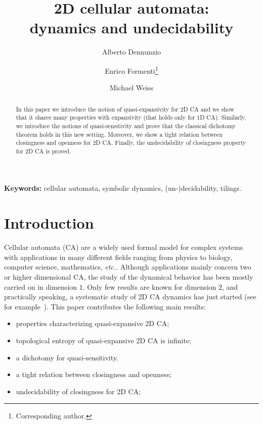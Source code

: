\documentclass{llncs}
\makeatletter
\newcommand{\etc}{\emph{etc.}\@\xspace}
\newcommand{\ignore}[1]{}
\makeatother
\begin{document}
\pagestyle{empty}  \mainmatter
\title{2D cellular automata:\\ dynamics and undecidability
\ignore{
\thanks{This work has been supported by
the PRIN/MIUR project
``Formal Languages and Automata: Mathematical and Applicative Aspects''.} }}\author{Alberto Dennunzio
\and Enrico Formenti\thanks{Corresponding author.}
\and Michael Weiss}
\maketitle

\begin{abstract}
In this paper we introduce the notion of quasi-expansivity for 2D
CA and we show that it shares many properties with expansivity (that holds only for 1D
CA). Similarly, we introduce the notions of quasi-sensitivity and prove that the classical dichotomy theorem holds in
this new setting. Moreover, we show a tight relation between 
closingness and openness for 2D CA. Finally, the undecidability of
closingness property for 2D CA is proved. 
\end{abstract}
\noindent
\textbf{Keywords:} cellular automata, symbolic dynamics, (un-)decidability, tilings.



\section{Introduction}
Cellular automata (CA) are a widely used formal model for complex systems with applications in many different fields ranging from
physics to biology, computer science, mathematics, \etc.
Although applications mainly concern two or higher dimensional
CA, the study of the dynamical behavior has been mostly carried on 
in dimension $1$. Only few results are known for dimension $2$, and practically speaking,  a systematic study of 2D CA dynamics has just started (see for example~\cite{theyssier08,dennunzio08}).
This paper contributes the following main results:
\begin{itemize}
\item properties characterizing quasi-expansive 2D CA;
\item topological entropy of quasi-expansive 2D CA is infinite;
\item a dichotomy for quasi-sensitivity.
\item a tight relation between closingness and openness;
\item undecidability of closingness for 2D CA;
\end{itemize}
\end{document}
